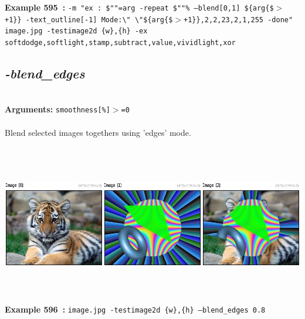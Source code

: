 \documentclass[a4paper,11pt,twoside]{book}
\begin{document}
\begin{center}
{\footnotesize \textbf{Example 595~:} \texttt{-m "ex : \$""=arg -repeat \$""\% --blend[0,1] \$\{arg\{\$$>$+1\}\} -text\_outline[-1] Mode:\textbackslash " \textbackslash "\$\{arg\{\$$>$+1\}\},2,2,23,2,1,255 -done" image.jpg -testimage2d \{w\},\{h\} -ex softdodge,softlight,stamp,subtract,value,vividlight,xor}}
\end{center}

\subsection{\emph{-blend\_edges} }\vspace*{-0.5em}
~\\\textbf{Arguments: } 
{\small \texttt{smoothness[\%]$>$=0}}\\~\\
Blend selected images togethers using 'edges' mode.
\begin{center}\includegraphics[keepaspectratio=true,height=7cm,width=\textwidth]{img/gmic_def596.jpg}\\
{\footnotesize \textbf{Example 596~:} \texttt{image.jpg -testimage2d \{w\},\{h\} --blend\_edges 0.8}}
\end{center}
\end{document}
